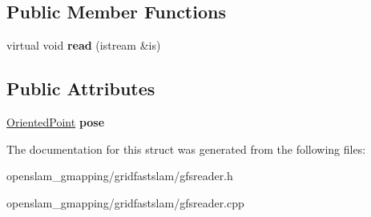 \subsection*{Public Member Functions}
\begin{DoxyCompactItemize}
\item 
\mbox{\label{structGMapping_1_1GFSReader_1_1RawOdometryRecord_a0cabaa75574da134fb8735a207c6fccb}} 
virtual void {\bfseries read} (istream \&is)
\end{DoxyCompactItemize}
\subsection*{Public Attributes}
\begin{DoxyCompactItemize}
\item 
\mbox{\label{structGMapping_1_1GFSReader_1_1RawOdometryRecord_a29bfe4896afcd8ac8616ed1a8c0cbf36}} 
\hyperlink{structGMapping_1_1orientedpoint}{Oriented\+Point} {\bfseries pose}
\end{DoxyCompactItemize}


The documentation for this struct was generated from the following files\+:\begin{DoxyCompactItemize}
\item 
openslam\+\_\+gmapping/gridfastslam/gfsreader.\+h\item 
openslam\+\_\+gmapping/gridfastslam/gfsreader.\+cpp\end{DoxyCompactItemize}
